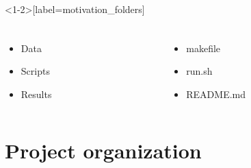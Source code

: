 \documentclass[xcolor=dvipsnames,xcolor=table, 14p]{beamer}
\begin{document}
\begin{frame}<1-2>[label=motivation_folders]\frametitle{
    }
    \begin{columns}
        \centering
        \begin{column}{0.33\textwidth}
            \begin{itemize}
                \item Data
                \item Scripts
                \item Results
            \end{itemize}
        \end{column}
        \begin{column}{0.33\textwidth}
            \begin{itemize}
                \item makefile
                \item run.sh
                \item README.md
            \end{itemize}
        \end{column}
    \end{columns}
\end{frame}


\section{Project organization}

\end{document}
